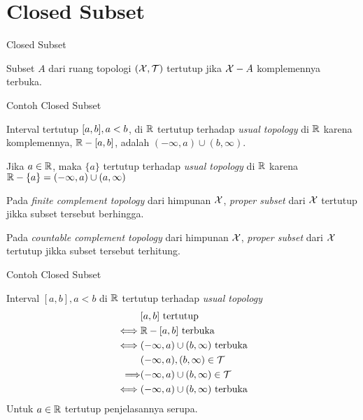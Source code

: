 \section{Closed Subset}
\begin{frame}{Closed Subset}
    \begin{tcolorbox}[enhanced,title=Definisi, frame style tile={width=\paperwidth}{\wallpaper}]
        Subset $A$ dari ruang topologi $(\mathcal{X}, \mathcal{T})$ tertutup jika $\mathcal{X} - A$ komplemennya terbuka.
    \end{tcolorbox}
\end{frame}

\begin{frame}{Contoh Closed Subset}
    \begin{tcolorbox}[enhanced,title=Contoh 38, frame style tile={width=\paperwidth}{\wallpaper}]
        Interval tertutup $[a,b], a < b$, di $\mathbb{R}$ tertutup terhadap \textit{usual topology}
        di $\mathbb{R}$ karena komplemennya, $\mathbb{R}-[a,b]$, adalah $(-\infty, a) \cup (b,\infty)$.

        Jika $a \in \mathbb{R}$, maka $\{a\}$ tertutup terhadap \textit{usual topology} di $\mathbb{R}$ karena 
        $\mathbb{R} - \{a\}=(-\infty,a) \cup (a,\infty)$

        Pada \textit{finite complement topology} dari himpunan $\mathcal{X}$, \textit{proper subset} dari
        $\mathcal{X}$ tertutup jikka subset tersebut berhingga.

        Pada \textit{countable complement topology} dari himpunan $\mathcal{X}$, \textit{proper subset} dari
        $\mathcal{X}$ tertutup jikka subset tersebut terhitung.
    \end{tcolorbox}
\end{frame}

\begin{frame}{Contoh Closed Subset}
    \begin{tcolorbox}[enhanced,title=Contoh 38 (Penjelasan), frame style tile={width=\paperwidth}{\wallpaper}]
        Interval $[a,b],a<b$ di $\mathbb{R}$ tertutup terhadap \textit{usual topology}
        \begin{align*}
            &[a,b] \text{ tertutup}\\
            \iff &\mathbb{R} - [a,b] \text{ terbuka}\\
            \iff &(-\infty, a) \cup (b,\infty) \text{ terbuka}\\
            &(-\infty, a),(b,\infty)\in \mathcal{T}\\
            \Longrightarrow& (-\infty, a) \cup (b,\infty) \in \mathcal{T}\\
            \iff&(-\infty, a) \cup (b,\infty) \text{ terbuka}\\
        \end{align*}
        Untuk $a\in \mathbb{R}$ tertutup penjelasannya serupa.
    \end{tcolorbox}
\end{frame}

